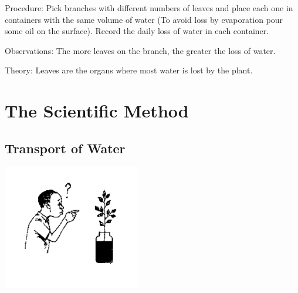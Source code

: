 \begin{multicols}{2}
\begin{description*}
\item[Procedure:]{Pick branches with different numbers of leaves and place each one in containers with the
same volume of water (To avoid loss by evaporation pour some oil on the surface). Record
the daily loss of water in each container.}
\item[Observations:]{The more leaves on the branch, the greater the loss of water.}
\item[Theory:]{Leaves are the organs where most water is lost by the plant.}
\end{description*}


\section*{The Scientific Method}


\subsection{Transport of Water} %

\begin{center}
\includegraphics[width=0.45\textwidth]{./img/source/sci-meth-ink-plant.png}
\end{center}


\end{multicols}
